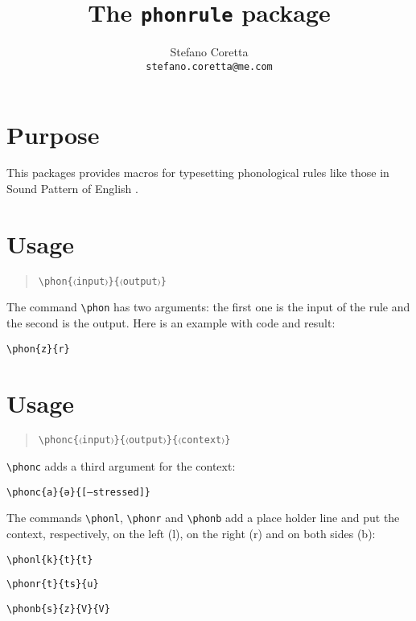 \documentclass[a4paper]{article}
\title{The \texttt{phonrule} package}
\author{Stefano Coretta \\ \texttt{stefano.coretta@me.com}}
\begin{document}
\maketitle

\section{Purpose}
This packages provides macros for typesetting phonological rules like those in Sound Pattern of English \citep{chomsky1968sound}.

\section{Usage}
\begin{quote}
\begin{verbatim}
\phon{〈input〉}{〈output〉}
\end{verbatim}
\end{quote}

The command \verb+\phon+ has two arguments: the first one is the input of the rule and the second is the output. Here is an example with code and result:

\begin{exe}
\ex \verb+\phon{z}{r}+
\ex {}
\end{exe}

\section{Usage}
\begin{quote}
\begin{verbatim}
\phonc{〈input〉}{〈output〉}{〈context〉}
\end{verbatim}
\end{quote}

\verb+\phonc+ adds a third argument for the context:

\begin{exe}
\ex \verb+\phonc{a}{ə}{[–stressed]}+
\ex {}
\end{exe}

The commands \verb+\phonl+, \verb+\phonr+ and \verb+\phonb+ add a place holder line and put the context, respectively, on the left (l), on the right (r) and on both sides (b):

\begin{exe}
\ex
	\begin{xlist}
	\ex \verb+\phonl{k}{t}{t}+
	\ex {}
	\end{xlist}
\ex
	\begin{xlist}
	\ex \verb+\phonr{t}{ts}{u}+
	\ex \phonr{t}{ts}{u}
	\end{xlist}
\ex
	\begin{xlist}
	\ex \verb+\phonb{s}{z}{V}{V}+
	\ex \phonb{s}{z}{V}{V}
	\end{xlist}
\end{exe}
\end{document}
